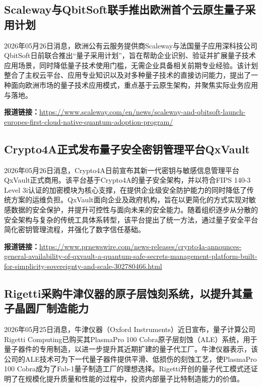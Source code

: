 \documentclass[12pt,a4paper]{ctexart}
\begin{document}
\subsection{ Scaleway与QbitSoft联手推出欧洲首个云原生量子采用计划 }

2026年05月26日消息，欧洲公有云服务提供商Scaleway与法国量子应用深科技公司QbitSoft日前联合推出“量子采用计划”，旨在帮助企业识别、验证并扩展量子技术应用场景，同时降低量子技术使用门槛，无需企业具备相关前期专业经验。该计划整合了主权云平台、应用专业知识以及对多种量子技术的直接访问能力，提出了一种面向欧洲市场的量子技术应用模式，重点基于云原生架构，并聚焦实际业务应用与落地。

\noindent\textbf{报道链接：}\url{https://www.scaleway.com/en/news/scaleway-and-qbitsoft-launch-europes-first-cloud-native-quantum-adoption-program/}

\subsection{ Crypto4A正式发布量子安全密钥管理平台QxVault }

2026年05月26日消息，Crypto4A日前宣布其新一代密钥与敏感信息管理平台QxVault正式商用。该平台基于Crypto4A的量子安全架构，并以符合FIPS 140-3 Level 3i认证的加密模块为核心支撑，在提供企业级安全防护能力的同时降低了传统方案的运维负担。QxVault面向企业及政府机构，旨在以更简化的方式实现对敏感数据的安全保护，并提升可控性与面向未来的安全能力。随着组织逐步从分散的安全架构与复杂的传统工具体系转型，该平台提出了统一方法，通过量子安全平台简化密钥管理流程，并强化了数字信任基础。

\noindent\textbf{报道链接：}\url{https://www.prnewswire.com/news-releases/crypto4a-announces-general-availability-of-qxvault-a-quantum-safe-secrets-management-platform-built-for-simplicity-sovereignty-and-scale-302780466.html}

\subsection{ Rigetti采购牛津仪器的原子层蚀刻系统，以提升其量子晶圆厂制造能力 }

2026年05月25日消息，牛津仪器（Oxford Instruments）近日宣布，量子计算公司Rigetti Computing已购买其PlasmaPro 100 Cobra原子层刻蚀（ALE）系统，用于量子器件的专用制造，以进一步提升其近期扩建的量子代工厂。牛津仪器表示，该公司的ALE技术可为下一代量子器件提供平滑、低损伤的刻蚀工艺，使PlasmaPro 100 Cobra成为了Fab-1量子制造工厂的理想选择。Rigetti开创的量子代工模式还证明了在规模化提升质量和性能的过程中，投资内部量子比特制造能力的价值。
\end{document}
